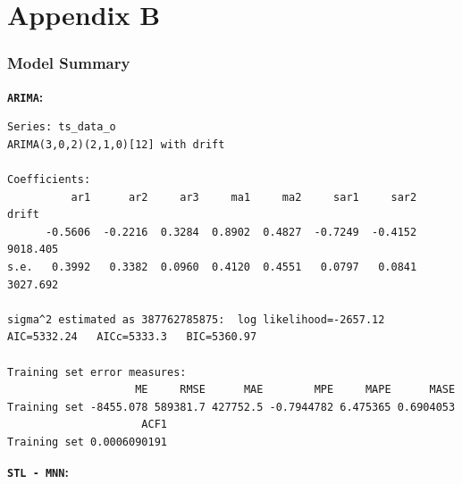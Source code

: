 \documentclass[openany]{book}
\begin{document}
\hypertarget{appendix-b}{%
\chapter*{Appendix B}\label{appendix-b}}

\hypertarget{model-b}{%
\subsection*{Model Summary}\label{model-b}}

\textbf{\texttt{ARIMA}:}

\begin{verbatim}
Series: ts_data_o 
ARIMA(3,0,2)(2,1,0)[12] with drift 

Coefficients:
          ar1      ar2     ar3     ma1     ma2     sar1     sar2     drift
      -0.5606  -0.2216  0.3284  0.8902  0.4827  -0.7249  -0.4152  9018.405
s.e.   0.3992   0.3382  0.0960  0.4120  0.4551   0.0797   0.0841  3027.692

sigma^2 estimated as 387762785875:  log likelihood=-2657.12
AIC=5332.24   AICc=5333.3   BIC=5360.97

Training set error measures:
                    ME     RMSE      MAE        MPE     MAPE      MASE
Training set -8455.078 589381.7 427752.5 -0.7944782 6.475365 0.6904053
                     ACF1
Training set 0.0006090191
\end{verbatim}

\textbf{\texttt{STL\ -\ MNN}:}
\end{document}
